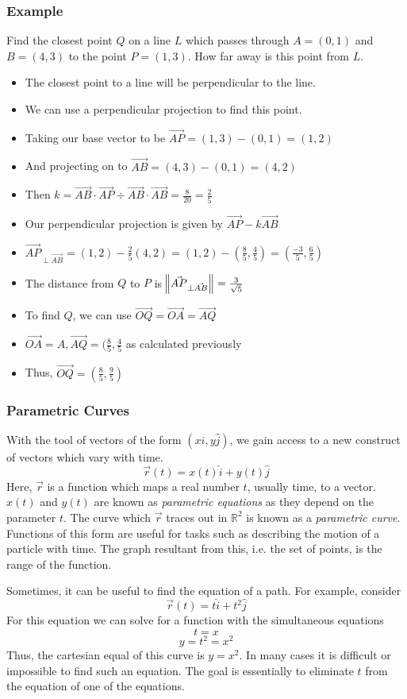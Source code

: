 \documentclass[12pt]{report}
\newcommand{\R}{\mathbb{R}}
\begin{document}
\begin{flushleft}
\subsubsection*{Example}
Find the closest point \(Q\) on a line \(L\) which passes through 
\(A = (0, 1)\) and \(B = (4, 3)\) to the point \(P = (1, 3)\). How far away
is this point from \(L\).
\begin{itemize}
    \item The closest point to a line will be perpendicular to the line.
    \item We can use a perpendicular projection to find this point.
    \item Taking our base vector to be \(\vec{AP} = (1, 3) - (0, 1) = (1, 2)\)
    \item And projecting on to \(\vec{AB} = (4, 3) - (0, 1) = (4, 2)\)
    \item Then \(k = \vec{AB}\cdot\vec{AP} \div \vec{AB}\cdot\vec{AB}
    = \frac{8}{20} = \frac{2}{5}\)
    \item Our perpendicular projection is given by \(\vec{AP} - k\vec{AB}\)
    \item \(\vec{AP}_{\perp\vec{AB}} = (1, 2) - \frac{2}{5}(4, 2) = (1, 2) - 
    (\frac{8}{5}, \frac{4}{5}) = (\frac{-3}{5}, \frac{6}{5})\)
    \item The distance from \(Q\) to \(P\) is 
    \(\norm{\vec{AP}_{\perp\vec{AB}}} = \frac{3}{\sqrt{5}}\)
    \item To find \(Q\), we can use \(\vec{OQ} = \vec{OA} = \vec{AQ}\)
    \item \(\vec{OA} = A, \vec{AQ} = (\frac{8}{5}, \frac{4}{5}\) as 
    calculated previously
    \item Thus, \(\vec{OQ} = (\frac{8}{5}, \frac{9}{5})\)
\end{itemize}

\subsubsection*{Parametric Curves}
With the tool of vectors of the form \((x\hat{i}, y\hat{j})\), we gain access
to a new construct of vectors which vary with time.
\[\vec{r}(t) = x(t)\hat{i} + y(t)\hat{j}\]
Here, \(\vec{r}\) is a function which maps a real number \(t\), usually time, 
to a vector. \(x(t)\) and \(y(t)\) are known as \textit{parametric equations} 
as they depend on the parameter \(t\). The curve which \(\vec{r}\) traces
out in \(\R^2\) is known as a \textit{parametric curve}. Functions of this form
are useful for tasks such as describing the motion of a particle with time. The
graph resultant from this, i.e. the set of points, is the range of the 
function.

\bigskip
Sometimes, it can be useful to find the equation of a path. For example, 
consider
\[\vec{r}(t) = t\hat{i} + t^2\hat{j}\]
For this equation we can solve for a function with the simultaneous 
equations
\[t = x\]
\[y = t^2 = x^2\]
Thus, the cartesian equal of this curve is \(y = x^2\). In many cases it is
difficult or impossible to find such an equation. The goal is essentially
to eliminate \(t\) from the equation of one of the equations.

\end{flushleft}
\end{document}
